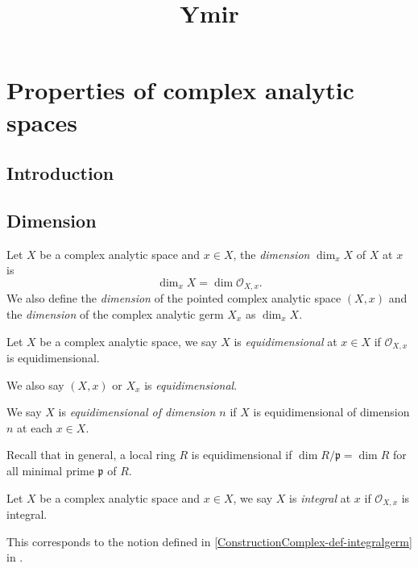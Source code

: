 
\title{Ymir}

\maketitle
\tableofcontents

\chapter*{Properties of complex analytic spaces}

\section{Introduction}\label{sec-introduction-propertycomplex}


\section{Dimension}

\begin{definition}
    Let $X$ be a complex analytic space and $x\in X$, the \emph{dimension} $\dim_x X$ of $X$ at $x$ is 
    \[
        \dim_x X=\dim \mathcal{O}_{X,x}.
    \]
    We also define the \emph{dimension} of the pointed complex analytic space $(X,x)$ and the \emph{dimension} of the complex analytic germ $X_x$ as $\dim_x X$.
\end{definition}

\begin{definition}
    Let $X$ be a complex analytic space, we say $X$ is \emph{equidimensional} at $x\in X$ if $\mathcal{O}_{X,x}$ is equidimensional.

    We also say $(X,x)$ or $X_x$ is \emph{equidimensional}.

    We say $X$ is \emph{equidimensional of dimension $n$} if $X$ is equidimensional of dimension $n$ at each $x\in X$.
\end{definition}
Recall that in general, a local ring $R$ is equidimensional if $\dim R/\mathfrak{p}=\dim R$ for all minimal prime $\mathfrak{p}$ of $R$.

\begin{definition}
    Let $X$ be a complex analytic space and $x\in X$, we say $X$ is \emph{integral} at $x$ if $\mathcal{O}_{X,x}$ is integral.
\end{definition}
This corresponds to the notion defined in \cref{ConstructionComplex-def-integralgerm} in .

